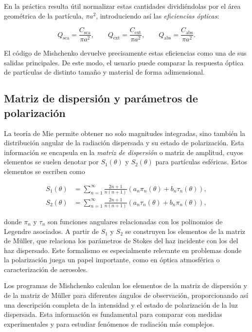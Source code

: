 \documentclass[12pt,a4paper]{article}
\begin{document}
En la práctica resulta útil normalizar estas cantidades dividiéndolas por el área geométrica de la partícula, $\pi a^2$, introduciendo así las \emph{eficiencias ópticas}:

\begin{equation}
  Q_{\text{sca}} = \frac{C_{\text{sca}}}{\pi a^2}, \qquad
  Q_{\text{ext}} = \frac{C_{\text{ext}}}{\pi a^2}, \qquad
  Q_{\text{abs}} = \frac{C_{\text{abs}}}{\pi a^2}.
\end{equation}

El código de Mishchenko devuelve precisamente estas eficiencias como una de sus salidas principales.
De este modo, el usuario puede comparar la respuesta óptica de partículas de distinto tamaño y material de forma adimensional.

\subsection{Matriz de dispersión y parámetros de polarización}

La teoría de Mie permite obtener no solo magnitudes integradas, sino también la distribución angular de la radiación dispersada y su estado de polarización.
Esta información se encapsula en la \emph{matriz de dispersión} o matriz de amplitud, cuyos elementos se suelen denotar por $S_1(\theta)$ y $S_2(\theta)$ para partículas esféricas.
Estos elementos se escriben como

\begin{align}
  S_1(\theta) &= \sum_{n=1}^{\infty} \frac{2n+1}{n(n+1)}
   \left( a_n \pi_n(\theta) + b_n \tau_n(\theta) \right), \\
  S_2(\theta) &= \sum_{n=1}^{\infty} \frac{2n+1}{n(n+1)}
   \left( a_n \tau_n(\theta) + b_n \pi_n(\theta) \right),
\end{align}

donde $\pi_n$ y $\tau_n$ son funciones angulares relacionadas con los polinomios de Legendre asociados.
A partir de $S_1$ y $S_2$ se construyen los elementos de la matriz de Müller, que relaciona los parámetros de Stokes del haz incidente con los del haz dispersado.
Este formalismo es especialmente relevante en problemas donde la polarización juega un papel importante, como en óptica atmosférica o caracterización de aerosoles.

Los programas de Mishchenko calculan los elementos de la matriz de dispersión y de la matriz de Müller para diferentes ángulos de observación, proporcionando así una descripción completa
de la intensidad y el estado de polarización de la luz dispersada.
Esta información es fundamental para comparar con medidas experimentales y para estudiar fenómenos de radiación más complejos.
\end{document}
